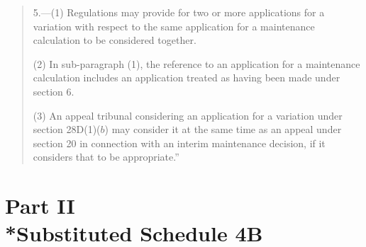 \documentclass[12pt,a4paper]{article}
\begin{document}
\begin{quotation}
5.---(1) Regulations may provide for two or more applications for a variation with respect to the same application for a maintenance calculation to be considered together.

(2) In sub-paragraph (1), the reference to an application for a maintenance calculation includes an application treated as having been made under section 6. 

(3) An appeal tribunal considering an application for a variation under section 28D(1)($b$)  may consider it at the same time as an appeal under section 20 in connection with an interim maintenance decision, if it considers that to be appropriate.”
\end{quotation}

\section[Part II --- Substituted Schedule 4B]{Part II\\*Substituted Schedule 4B}

\renewcommand\parthead{--- Schedule 2 Part II}
\end{document}
